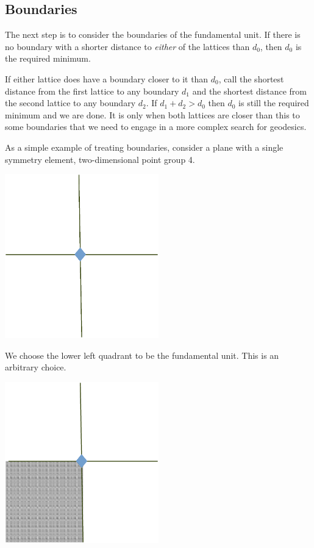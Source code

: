 \documentclass[preprint]{iucr}              %
\numberwithin{equation}{section}
\begin{document}
	\subsection{Boundaries}
	
	The next step is to consider the boundaries of the fundamental
	unit. If there is no boundary with a shorter distance to
	 \textit{either} of	the lattices than $d_0$, then $d_0$ is the required minimum.  
	 
	If either lattice does have a boundary closer to it than
	$d_0$, call the shortest distance from the first lattice
	to any boundary $d_1$ and the shortest distance
	from the second lattice to any boundary $d_2$.  If 
	$d_1 +d_2 > d_0$ then $d_0$ is still the required
	minimum and we are done.   It is only when both lattices
	are closer than this to some boundaries that we need to
	engage in a more complex search for geodesics. 
	
	As a simple example of treating boundaries, consider a plane with a single
	symmetry element, two-dimensional point group 4.
	
	\includegraphics[width = 0.5\textwidth ]{4_1}
	
	We choose the lower left quadrant to be the fundamental unit.
    This is an arbitrary choice.
	
	\includegraphics[width = 0.5\textwidth ]{4_1_1}
	
\end{document}
